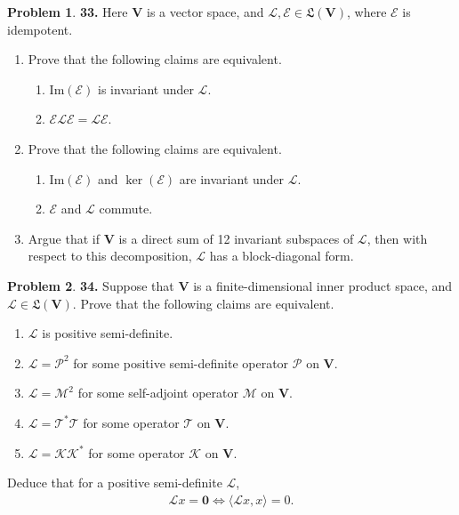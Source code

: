 \documentclass{book}
\theoremstyle{definition}
\newtheorem*{prob*}{Problem}
\newcommand{\V}{\mathbf{V}}
\newcommand{\lag}{\mathcal{L}}
\newcommand{\M}{\mathcal{M}}
\newcommand{\K}{\mathcal{K}}
\newcommand{\E}{\mathcal{E}}
\newcommand{\ima}{\text{Im}}
\newcommand{\T}{\mathcal{T}}
\newcommand{\LL}{\mathfrak{L}}
\newcommand{\la}{\langle}
\newcommand{\ra}{\rangle}
\begin{document}
\newpage




\begin{prob*}\textbf{33.} Here $\V$ is a vector space, and $\lag, \E \in \LL(\V)$, where $\E$ is idempotent.
	\begin{enumerate}
		\item Prove that the following claims are equivalent.
		\begin{enumerate}
			\item $\ima(\E)$ is invariant under $\lag$.
			\item $\E\lag\E = \lag \E$.
		\end{enumerate}
	
	
		\item Prove that the following claims are equivalent.
		\begin{enumerate}
			\item $\ima(\E)$ and $\ker(\E)$ are invariant under $\lag$.
			\item $\E$ and $\lag$ commute.
		\end{enumerate}
	
	
		\item Argue that if $\V$ is a direct sum of 12 invariant subspaces of $\lag$, then with respect to this decomposition, $\lag$ has a block-diagonal form.
	\end{enumerate}
	
\end{prob*}


\newpage




\begin{prob*}\textbf{34.} Suppose that $\V$ is a finite-dimensional inner product space, and $\lag \in \LL(\V)$. Prove that the following claims are equivalent.
	\begin{enumerate}
		\item $\lag$ is positive semi-definite.
		\item $\lag = \mathcal{P}^2$ for some positive semi-definite operator $\mathcal{P}$ on $\V$.
		\item $\lag= \M^2$ for some self-adjoint operator $\M$ on $\V$.
		\item $\lag = \T^*\T$ for some operator $\T$ on $\V$.
		\item $\lag = \K\K^*$ for some operator $\K$ on $\V$.
	\end{enumerate}
	
	Deduce that for a positive semi-definite $\lag$,
	\begin{align*}
	\lag x = \mathbf{0} \iff \la \lag x,x\ra= 0.
	\end{align*}
	
\end{prob*}
\end{document}
